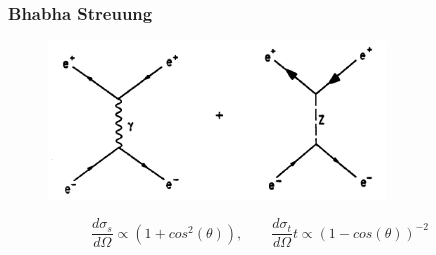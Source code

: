 \begin{frame}
	\frametitle{Bhabha Streuung }
	\begin{center}
		\begin{figure}
			\includegraphics[width=0.8\textwidth]{graphics/Bhabbastreuung.png}
		\end{figure}
	\end{center}
	\begin{equation*}
	\frac{d\sigma_s}{d\Omega} \propto (1+cos^2(\theta)),\qquad\frac{d\sigma_t}{d\Omega}t \propto (1-cos(\theta))^{-2}
	\end{equation*}
\end{frame}
